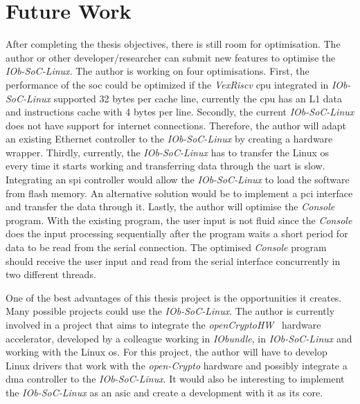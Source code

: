 \section{Future Work}
\label{section:future}
After completing the thesis objectives, there is still room for optimisation. The author or other developer/researcher can submit new features to optimise the \textit{IOb-SoC-Linux}. The author is working on four optimisations. First, the performance of the \acrshort{soc} could be optimized if the \textit{VexRiscv} \acrshort{cpu} integrated in \textit{IOb-SoC-Linux} supported 32 bytes per cache line, currently the \acrshort{cpu} has an L1 data and instructions cache with 4 bytes per line. Secondly, the current \textit{IOb-SoC-Linux} does not have support for internet connections. Therefore, the author will adapt an existing Ethernet controller to the \textit{IOb-SoC-Linux} by creating a hardware wrapper. Thirdly, currently, the \textit{IOb-SoC-Linux} has to transfer the Linux \acrshort{os} every time it starts working and transferring data through the \acrshort{uart} is slow. Integrating an \acrfull{spi} controller would allow the \textit{IOb-SoC-Linux} to load the software from flash memory. An alternative solution would be to implement a \acrshort{pci} interface and transfer the data through it. Lastly, the author will optimise the \textit{Console} program. With the existing program, the user input is not fluid since the \textit{Console} does the input processing sequentially after the program waits a short period for data to be read from the serial connection. The optimised \textit{Console} program should receive the user input and read from the serial interface concurrently in two different threads.

One of the best advantages of this thesis project is the opportunities it creates. Many possible projects could use the \textit{IOb-SoC-Linux}. The author is currently involved in a project that aims to integrate the \textit{openCryptoHW}~\cite{open_crypto_hw} hardware accelerator, developed by a colleague working in \textit{IObundle}, in \textit{IOb-SoC-Linux} and working with the Linux \acrshort{os}. For this project, the author will have to develop Linux drivers that work with the \textit{open-Crypto} hardware and possibly integrate a \acrshort{dma} controller to the \textit{IOb-SoC-Linux}. It would also be interesting to implement the \textit{IOb-SoC-Linux} as an \acrshort{asic} and create a development with it as its core.
